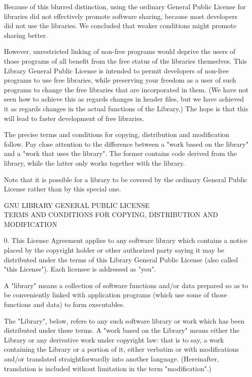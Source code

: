 Because of this blurred distinction, using the ordinary General
Public License for libraries did not effectively promote software
sharing, because most developers did not use the libraries. We
concluded that weaker conditions might promote sharing better.

However, unrestricted linking of non-free programs would deprive the
users of those programs of all benefit from the free status of the
libraries themselves. This Library General Public License is intended to
permit developers of non-free programs to use free libraries, while
preserving your freedom as a user of such programs to change the free
libraries that are incorporated in them. (We have not seen how to achieve
this as regards changes in header files, but we have achieved it as regards
changes in the actual functions of the Library.) The hope is that this
will lead to faster development of free libraries.

The precise terms and conditions for copying, distribution and
modification follow. Pay close attention to the difference between a
"work based on the library" and a "work that uses the library". The
former contains code derived from the library, while the latter only
works together with the library.

Note that it is possible for a library to be covered by the ordinary
General Public License rather than by this special one.

\begin{center}
		GNU LIBRARY GENERAL PUBLIC LICENSE\\
 TERMS AND CONDITIONS FOR COPYING, DISTRIBUTION AND MODIFICATION
\end{center}

0. This License Agreement applies to any software library which
contains a notice placed by the copyright holder or other authorized
party saying it may be distributed under the terms of this Library
General Public License (also called "this License"). Each licensee is
addressed as "you".

A "library" means a collection of software functions and/or data
prepared so as to be conveniently linked with application programs
(which use some of those functions and data) to form executables.

The "Library", below, refers to any such software library or work
which has been distributed under these terms. A "work based on the
Library" means either the Library or any derivative work under
copyright law: that is to say, a work containing the Library or a
portion of it, either verbatim or with modifications and/or translated
straightforwardly into another language. (Hereinafter, translation is
included without limitation in the term "modification".)

